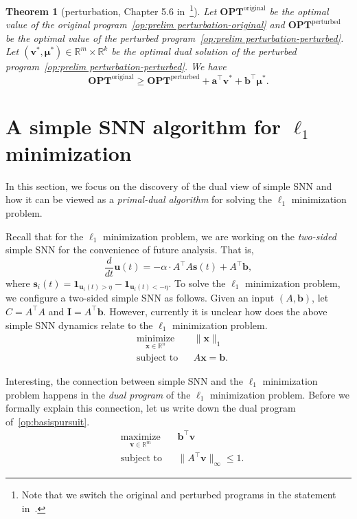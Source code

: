 \documentclass[11pt]{article}
\newtheorem{theorem}{Theorem}
\theoremstyle{remark}
\theoremstyle{definition}
\newcommand{\bx}{\mathbf{x}}
\newcommand{\bb}{\mathbf{b}}
\newcommand{\bv}{\mathbf{v}}
\newcommand{\bI}{\mathbf{I}}
\newcommand{\bu}{\mathbf{u}}
\newcommand{\bs}{\mathbf{s}}
\newcommand{\bmu}{\boldsymbol{\mu}}
\newcommand{\OPT}{\mathbf{OPT}}
\newcommand{\R}{{\mathbb R}} %
\begin{document}
\begin{theorem}[perturbation, Chapter 5.6 in~\cite{boyd2004convex}\footnote{Note that we switch the original and perturbed programs in the statement in~\cite{boyd2004convex}.}]
	\vspace{1em}
	
	Let $\OPT^{\text{original}}$ be the optimal value of the original program~\eqref{op:prelim perturbation-original} and $\OPT^{\text{perturbed}}$ be the optimal value of the perturbed program~\eqref{op:prelim perturbation-perturbed}. Let $(\bv^*,\bmu^*)\in\R^m\times\R^k$ be the optimal dual solution of the perturbed program~\eqref{op:prelim perturbation-perturbed}. We have
	\begin{equation*}
	\OPT^{\text{original}}\geq\OPT^{\text{perturbed}}+\mathbf{a}^\top\bv^*+\mathbf{b}^\top\bmu^*.
	\end{equation*}
\end{theorem}


\section{A simple SNN algorithm for $\ell_1$ minimization}\label{sec:SNN-simple-l1min}
In this section, we focus on the discovery of the dual view of simple SNN and how it can be viewed as a \emph{primal-dual algorithm} for solving the $\ell_1$ minimization problem.

Recall that for the $\ell_1$ minimization problem, we are working on the \textit{two-sided} simple SNN for the convenience of future analysis. That is,
$$
\frac{d}{dt}\bu(t) = -\alpha\cdot A^\top A\bs(t) +A^\top\bb,
$$
where $\bs_i(t)=\mathbf{1}_{\bu_i(t)>\eta}-\mathbf{1}_{\bu_i(t)<-\eta}$. To solve the $\ell_1$ minimization problem, we configure a two-sided simple SNN as follows. Given an input $(A,\bb)$, let $C=A^\top A$ and $\bI=A^\top\bb$. However, currently it is unclear how does the above simple SNN dynamics relate to the $\ell_1$ minimization problem.
\begin{equation}\label{op:basispursuit}
\begin{aligned}
& \underset{\bx\in\R^n}{\text{minimize}}
& & \|\bx\|_1 \\
& \text{subject to}
& & A\bx=\bb.
\end{aligned}
\end{equation}

Interesting, the connection between simple SNN and the $\ell_1$ minimization problem happens in the \textit{dual program} of the $\ell_1$ minimization problem. Before we formally explain this connection, let us write down the dual program of~\eqref{op:basispursuit}.
\begin{equation}\label{op:basispursuit-dual}
\begin{aligned}
& \underset{\bv\in\R^m}{\text{maximize}}
& & \bb^{\top}\bv \\
& \text{subject to}
& & \|A^{\top}\bv\|_{\infty}\leq1.
\end{aligned}
\end{equation}
\end{document}
